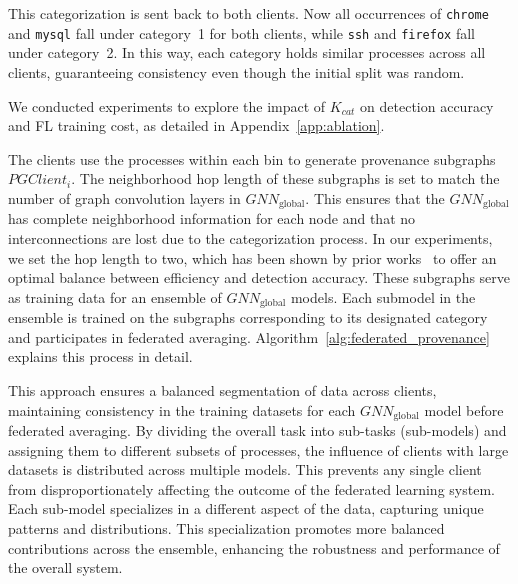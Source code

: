 This categorization is sent back to both clients. Now all occurrences of \texttt{chrome} and \texttt{mysql} fall under category~1 for both clients, while \texttt{ssh} and \texttt{firefox} fall under category~2. In this way, each category holds similar processes across all clients, guaranteeing consistency even though the initial split was random.

We conducted experiments to explore the impact of \( K_{cat} \) on detection accuracy and FL training cost, as detailed in Appendix~\ref{app:ablation}.

The clients use the processes within each bin to generate provenance subgraphs \( PGClient_{i} \). The neighborhood hop length of these subgraphs is set to match the number of graph convolution layers in \( {GNN}_{\text{global}} \). This ensures that the \({GNN}_{\text{global}}\) has complete neighborhood information for each node and that no interconnections are lost due to the categorization process. In our experiments, we set the hop length to two, which has been shown by prior works~\cite{wang2022threatrace,flash2024} to offer an optimal balance between efficiency and detection accuracy. These subgraphs serve as training data for an ensemble of \({GNN}_{\text{global}}\) models. Each submodel in the ensemble is trained on the subgraphs corresponding to its designated category and participates in federated averaging. Algorithm~\ref{alg:federated_provenance} explains this process in detail.

This approach ensures a balanced segmentation of data across clients, maintaining consistency in the training datasets for each \({GNN}_{\text{global}}\) model before federated averaging. By dividing the overall task into sub-tasks (sub-models) and assigning them to different subsets of processes, the influence of clients with large datasets is distributed across multiple models. This prevents any single client from disproportionately affecting the outcome of the federated learning system. Each sub-model specializes in a different aspect of the data, capturing unique patterns and distributions. This specialization promotes more balanced contributions across the ensemble, enhancing the robustness and performance of the overall system.


